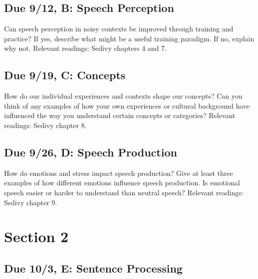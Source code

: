 \documentclass[
  letterpaper,
  DIV=11,
  numbers=noendperiod]{scrreprt}
\begin{document}
\hypertarget{due-912-b-speech-perception}{%
\subsection*{Due 9/12, B: Speech
Perception}\label{due-912-b-speech-perception}}

Can speech perception in noisy contexts be improved through training and
practice? If yes, describe what might be a useful training paradigm. If
no, explain why not. Relevant readings: Sedivy chapters 4 and 7.

\hypertarget{due-919-c-concepts}{%
\subsection*{Due 9/19, C: Concepts}\label{due-919-c-concepts}}

How do our individual experiences and contexts shape our concepts? Can
you think of any examples of how your own experiences or cultural
background have influenced the way you understand certain concepts or
categories? Relevant readings: Sedivy chapter 8.

\hypertarget{due-926-d-speech-production}{%
\subsection*{Due 9/26, D: Speech
Production}\label{due-926-d-speech-production}}

How do emotions and stress impact speech production? Give at least three
examples of how different emotions influence speech production. Is
emotional speech easier or harder to understand than neutral speech?
Relevant readings: Sedivy chapter 9.

\hypertarget{section-2}{%
\section*{\texorpdfstring{{Section 2}}{Section 2}}\label{section-2}}


\hypertarget{due-103-e-sentence-processing}{%
\subsection*{Due 10/3, E: Sentence
Processing}\label{due-103-e-sentence-processing}}
\end{document}
